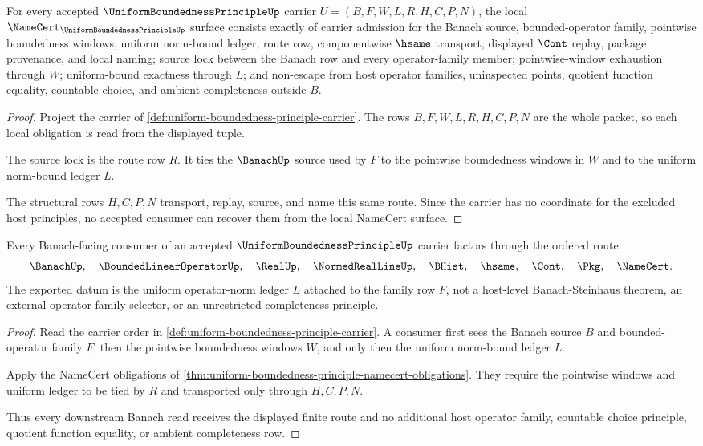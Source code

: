 \begin{theorem}
\label{thm:uniform-boundedness-principle-namecert-obligations}
For every accepted $\UniformBoundednessPrincipleUp$ carrier $U=(B,F,W,L,R,H,C,P,N)$, the local $\NameCert_{\UniformBoundednessPrincipleUp}$ surface consists exactly of carrier admission for the Banach source, bounded-operator family, pointwise boundedness windows, uniform norm-bound ledger, route row, componentwise $\hsame$ transport, displayed $\Cont$ replay, package provenance, and local naming; source lock between the Banach row and every operator-family member; pointwise-window exhaustion through $W$; uniform-bound exactness through $L$; and non-escape from host operator families, uninspected points, quotient function equality, countable choice, and ambient completeness outside $B$.
\end{theorem}
\begin{proof}
Project the carrier of \autoref{def:uniform-boundedness-principle-carrier}. The rows $B,F,W,L,R,H,C,P,N$ are the whole packet, so each local obligation is read from the displayed tuple.

The source lock is the route row $R$. It ties the $\BanachUp$ source used by $F$ to the pointwise boundedness windows in $W$ and to the uniform norm-bound ledger $L$.

The structural rows $H,C,P,N$ transport, replay, source, and name this same route. Since the carrier has no coordinate for the excluded host principles, no accepted consumer can recover them from the local NameCert surface.
\end{proof}

\begin{theorem}
\label{thm:uniform-boundedness-principle-banach-handoff}
Every Banach-facing consumer of an accepted $\UniformBoundednessPrincipleUp$ carrier factors through the ordered route
$$
\BanachUp,\quad \BoundedLinearOperatorUp,\quad \RealUp,\quad \NormedRealLineUp,\quad \BHist,\quad \hsame,\quad \Cont,\quad \Pkg,\quad \NameCert .
$$
The exported datum is the uniform operator-norm ledger $L$ attached to the family row $F$, not a host-level Banach-Steinhaus theorem, an external operator-family selector, or an unrestricted completeness principle.
\end{theorem}
\begin{proof}
Read the carrier order in \autoref{def:uniform-boundedness-principle-carrier}. A consumer first sees the Banach source $B$ and bounded-operator family $F$, then the pointwise boundedness windows $W$, and only then the uniform norm-bound ledger $L$.

Apply the NameCert obligations of \autoref{thm:uniform-boundedness-principle-namecert-obligations}. They require the pointwise windows and uniform ledger to be tied by $R$ and transported only through $H,C,P,N$.

Thus every downstream Banach read receives the displayed finite route and no additional host operator family, countable choice principle, quotient function equality, or ambient completeness row.
\end{proof}

